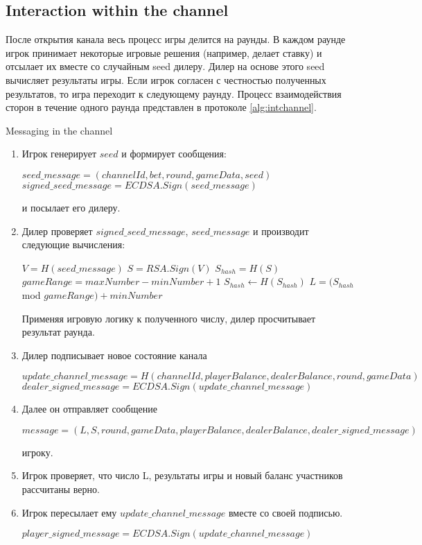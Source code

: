 		\subsection {Interaction within the channel}
После открытия канала весь процесс игры делится на раунды. В каждом раунде игрок принимает некоторые игровые решения (например, делает ставку) и отсылает их вместе со случайным seed дилеру. Дилер на основе этого seed вычисляет результаты игры. Если игрок согласен с честностью полученных результатов, то игра переходит к следующему раунду. Процесс взаимодействия сторон в течение одного раунда представлен в протоколе \autoref{alg:intchannel}. \\
\begin{algorithm}
\caption{Messaging in the channel} \label{alg:intchannel}
\begin{enumerate}
	\item Игрок генерирует $seed$  и  формирует сообщения:
\begin{center}
$ seed\_message = (channelId, bet, round, gameData, seed)$
$signed\_seed\_message = ECDSA.Sign(seed\_message)$ 
\end{center}
 и посылает его дилеру. 
	\item Дилер проверяет $signed\_seed\_message$, $seed\_message$ и производит следующие вычисления:
 \begin{algorithmic}
\State $V = H(seed\_message)$
\State $S = RSA.Sign(V)$
\State $S_{hash} = H(S)$
\State $gameRange = maxNumber -  minNumber + 1$
\State$ S_{hash}\gets H(S_{hash})$
\EndWhile
\State $L = (S_{hash}$ mod $gameRange) + minNumber$
 \end{algorithmic}
 Применяя игровую логику к полученного числу, дилер просчитывает результат раунда.
\item Дилер подписывает новое состояние канала
\begin{center}

$update\_channel\_message = H(channelId, playerBalance, dealerBalance, round, gameData)$
$dealer\_signed\_message = ECDSA.Sign(update\_channel\_message)$

\end{center}
\item Далее он отправляет сообщение
\begin{center}

$message = (L,S, round, gameData, playerBalance, dealerBalance, dealer\_signed\_message)$

\end{center}
 игроку.
	\item Игрок проверяет, что число L, результаты игры и новый баланс участников рассчитаны верно.
	\item Игрок пересылает ему $update\_channel\_message$ вместе со своей подписью. 
\begin{center}
 $player\_signed\_message = ECDSA.Sign(update\_channel\_message)$
\end{center}
\end{enumerate}
\end{algorithm}


